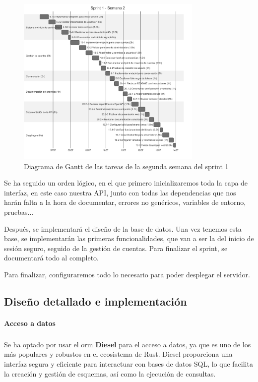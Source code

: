 \begin{figure}[H]
    \begin{center}
        \includegraphics[width=0.8\textwidth]{assets/sprint1/sprint1-week2.png}
    \end{center}
    \caption{Diagrama de Gantt de las tareas de la segunda semana del sprint 1}\label{fig:sprint1-week2}
\end{figure}

Se ha seguido un orden lógico, en el que primero inicializaremos toda la capa de interfaz, en este caso nuestra API, junto con todas las dependencias que nos harán falta a la hora de documentar, errores no genéricos, variables de entorno, pruebas...

Después, se implementará el diseño de la base de datos. Una vez tenemos esta base, se implementarán las primeras funcionalidades, que van a ser la del inicio de sesión seguro, seguido de la gestión de cuentas. Para finalizar el sprint, se documentará todo al completo.

Para finalizar, configuraremos todo lo necesario para poder desplegar el servidor.

\subsection{Diseño detallado e implementación}

\paragraph{Acceso a datos}
\subparagraph{}
Se ha optado por usar el \acrshort{orm} \textbf{Diesel} para el acceso a datos, ya que es uno de los más populares y robustos en el ecosistema de Rust. Diesel proporciona una interfaz segura y eficiente para interactuar con bases de datos SQL, lo que facilita la creación y gestión de esquemas, así como la ejecución de consultas.

